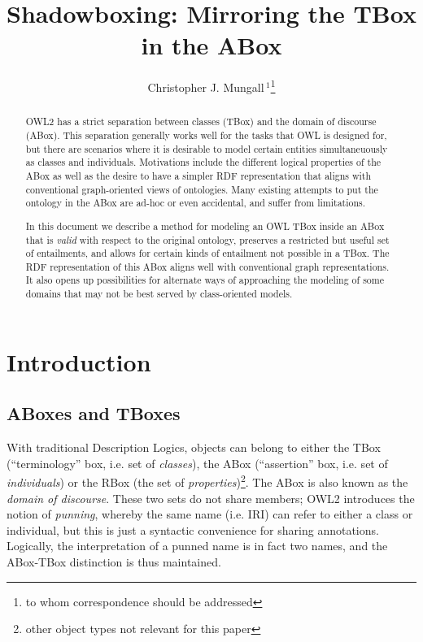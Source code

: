 \documentclass{my}
\begin{document}

\title{Shadowboxing: Mirroring the TBox in the ABox}

\author{Christopher J. Mungall\,$^{1}$\footnote{to whom correspondence should be addressed}}
\address{$^{1}$Genomics Division, Lawrence Berkeley National Laboratory, MS84R017, 1 Cyclotron Road, Berkeley, CA 94720 USA}

\history{}

\editor{}

\maketitle

\begin{abstract}

OWL2 has a strict separation between classes (TBox) and the domain of
discourse (ABox). This separation generally works well for the tasks
that OWL is designed for, but there are scenarios where it is
desirable to model certain entities simultaneuously as classes and
individuals. Motivations include the different logical properties of
the ABox as well as the desire to have a simpler RDF representation
that aligns with conventional graph-oriented views of ontologies. Many
existing attempts to put the ontology in the ABox are ad-hoc or even
accidental, and suffer from limitations.

In this document we describe a method for modeling an OWL TBox inside
an ABox that is \emph{valid} with respect to the original ontology,
preserves a restricted but useful set of entailments, and allows for
certain kinds of entailment not possible in a TBox. The RDF
representation of this ABox aligns well with conventional graph
representations. It also opens up possibilities for alternate ways of
approaching the modeling of some domains that may not be best served
by class-oriented models.

\end{abstract}

\section{Introduction}

\subsection{ABoxes and TBoxes}

With traditional Description Logics, objects can belong to either the
TBox (``terminology'' box, i.e. set of \emph{classes}), the ABox
(``assertion'' box, i.e. set of \emph{individuals}) or the RBox (the
set of \emph{properties})\footnote{other object types not relevant for
  this paper}. The ABox is also known as the \emph{domain of
  discourse}. These two sets do not share members; OWL2 introduces the
notion of \emph{punning}, whereby the same name (i.e. IRI) can refer
to either a class or individual, but this is just a syntactic
convenience for sharing annotations. Logically, the interpretation of
a punned name is in fact two names, and the ABox-TBox distinction is
thus maintained.
\end{document}
